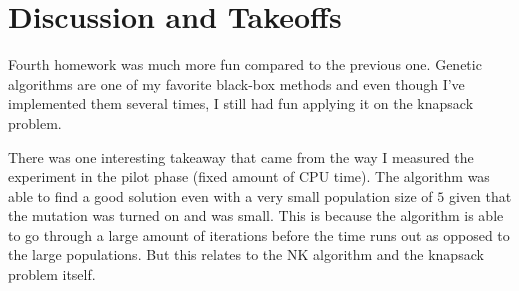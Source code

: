 \documentclass[a4paper,10pt]{article}
\begin{document}
\clearpage
\section{Discussion and Takeoffs}

Fourth homework was much more fun compared to the previous one. Genetic algorithms are one of my favorite black-box methods and even though I've implemented them several times, I still had fun applying it on the knapsack problem.

There was one interesting takeaway that came from the way I measured the experiment in the pilot phase (fixed amount of CPU time). The algorithm was able to find a good solution even with a very small population size of $5$ given that the mutation was turned on and was small. This is because the algorithm is able to go through a large amount of iterations before the time runs out as opposed to the large populations. But this relates to the NK algorithm and the knapsack problem itself.
\end{document}
